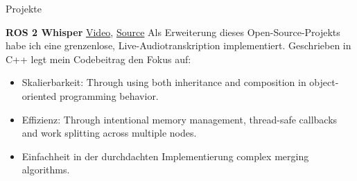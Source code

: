 \begin{rubric}{Projekte}

\entry*[2024] \textbf{ROS 2 Whisper} \hfill \href{https://github.com/NathanCorral/ros2_whisper/blob/dev-code-cleanup/doc/harry_potter_sample.gif}{Video}, \href{https://github.com/NathanCorral/ros2_whisper/tree/dev-code-cleanup}{\faGithub Source} \newline  
Als Erweiterung dieses Open-Source-Projekts habe ich eine grenzenlose, Live-Audiotranskription implementiert. Geschrieben in C++ legt mein Codebeitrag den Fokus auf: \newline  
\vspace{\CVItemizeHeaderSpacing} \begin{itemize}  
	\setlength{\itemsep}{\CVItemizeSpacing}  
	\item Skalierbarkeit:  Through using both inheritance and composition in object-oriented programming behavior.
	\item Effizienz:  Through intentional memory management, thread-safe callbacks and work splitting across multiple nodes.
	\item Einfachheit in der durchdachten Implementierung complex merging algorithms.
\end{itemize}  
\begin{comment}
\entry*[2024] \textbf{ROS 2 Computer Vision} \hfill \href{https://github.com/NathanCorral/ROS-HF-Vision/blob/main/doc/gifs/ex_german_roads.gif}{Video}, \href{https://github.com/NathanCorral/ROS-HF-Vision/tree/main}{\faGithub Source} \newline  
Das Ausführen mehrerer Computer-Vision-Modelle (DETR, Maskformer), die für verschiedene Datensätze/Aufgaben trainiert wurden, auf einem Live-Kamerastream stellt mehrere Implementierungsherausforderungen dar. Dieses Python-Repository bietet eine Lösung für: \newline  
\vspace{\CVItemizeHeaderSpacing} \begin{itemize}  
	\setlength{\itemsep}{\CVItemizeSpacing}  
	\item Das Herunterladen und Ausführen von State-of-the-Art-Modellen aus Hugging Face als asynchrone ROS 2 Nodes.  
	\item Das Hosten eines Label Server, um Modell-Ausgaben in einer globalen Datenbank neu zu adressieren.  
	\item Die Anzeige von Segmentation Masks und Bounding Boxes als Matplotlib Animations.  
	\item Das Veröffentlichen von Datensatzbildern zur wiederholbaren Evaluierung von CV-Modellen.  
\end{itemize}  


\end{comment}
\end{rubric}
